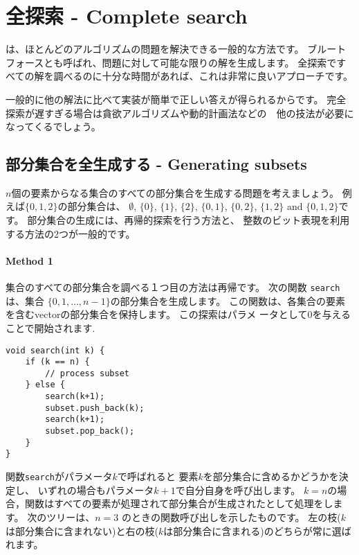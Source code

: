 \chapter{全探索 - Complete search}

は、ほとんどのアルゴリズムの問題を解決できる一般的な方法です。
ブルートフォースとも呼ばれ、問題に対して可能な限りの解を生成します。
全探索ですべての解を調べるのに十分な時間があれば、これは非常に良いアプローチです。

一般的に他の解法に比べて実装が簡単で正しい答えが得られるからです。
完全探索が遅すぎる場合は貪欲アルゴリズムや動的計画法などの　他の技法が必要になってくるでしょう。

\section{部分集合を全生成する - Generating subsets}


$n$個の要素からなる集合のすべての部分集合を生成する問題を考えましょう。
例えば$\{0,1,2\}$の部分集合は、
$\emptyset$, $\{0\}$, $\{1\}$, $\{2\}$, $\{0,1\}$,
$\{0,2\}$, $\{1,2\}$ and $\{0,1,2\}$です。
部分集合の生成には、再帰的探索を行う方法と、
整数のビット表現を利用する方法の2つが一般的です。

\subsubsection{Method 1}

集合のすべての部分集合を調べる１つ目の方法は再帰です。
次の関数 \texttt{search}は、集合 $\{0,1,\ldots,n-1\}$の部分集合を生成します。
この関数は、各集合の要素を含むvectorの部分集合を保持します。
この探索はパラメ ータとして0を与えることで開始されます.

\begin{lstlisting}
void search(int k) {
    if (k == n) {
        // process subset
    } else {
        search(k+1);
        subset.push_back(k);
        search(k+1);
        subset.pop_back();
    }
}
\end{lstlisting}

関数\texttt{search}がパラメータ$k$で呼ばれると
要素$k$を部分集合に含めるかどうかを決定し、
いずれの場合もパラメータ$k + 1$で自分自身を呼び出します。
$k = n$の場合，関数はすべての要素が処理されて部分集合が生成されたとして処理をします。
次のツリーは、$n = 3$ のときの関数呼び出しを示したものです。
左の枝($k$ は部分集合に含まれない)と右の枝($k$は部分集合に含まれる)のどちらが常に選ばれます。

